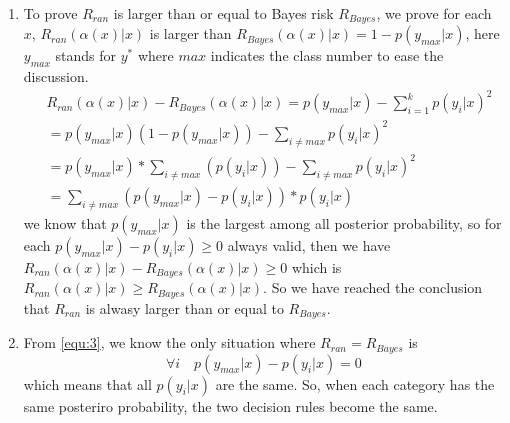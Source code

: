 \documentclass[paper=a4, fontsize=11pt]{scrartcl} %
\numberwithin{equation}{section} %
\numberwithin{figure}{section} %
\numberwithin{table}{section} %
\begin{document}
\begin{enumerate}
\item To prove $R_{ran}$ is larger than or equal to Bayes risk $R_{Bayes}$, we prove for each $x$, $R_{ran}(\alpha(x)|x)$ is larger than $R_{Bayes}(\alpha(x)|x) = 1 - p(y_{max}|x)$, here $y_{max}$ stands for $y^{*}$ where $max$ indicates the class number to ease the discussion. 
\begin{equation}
\begin{split}
& R_{ran}(\alpha(x)|x) - R_{Bayes}(\alpha(x)|x) = p(y_{max}|x) - \sum_{i=1}^{k}p(y_{i}|x)^2 \\ & = p(y_{max}|x)(1-p(y_{max}|x)) - \sum_{i\neq max}p(y_{i}|x)^2 \\ & = p(y_{max}|x)*\sum_{i\neq max}(p(y_{i}|x)) - \sum_{i\neq max}p(y_{i}|x)^2 \\ & = \sum_{i\neq max}(p(y_{max}|x) - p(y_{i}|x))*p(y_{i}|x)
\label{equ:3}
\end{split}
\end{equation}
we know that $p(y_{max}|x)$ is the largest among all posterior probability, so for each $p(y_{max}|x) - p(y_{i}|x) \ge 0$ always valid, then we have $R_{ran}(\alpha(x)|x) - R_{Bayes}(\alpha(x)|x) \ge 0$ which is $R_{ran}(\alpha(x)|x) \ge R_{Bayes}(\alpha(x)|x)$. So we have reached the conclusion that $R_{ran}$ is alwasy larger than or equal to $R_{Bayes}$.

\item From \ref{equ:3}, we know the only situation where $R_{ran} = R_{Bayes}$ is $$\forall i\quad p(y_{max}|x) - p(y_{i}|x) = 0$$ which means that all $p(y_i|x)$ are the same. So, when each category has the same posteriro probability, the two decision rules become the same. 
\end{enumerate}

\end{document}

